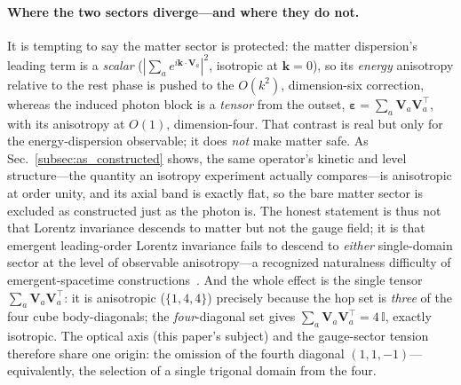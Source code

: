 \paragraph{Where the two sectors diverge---and where they do not.} It is tempting to say
the matter sector is protected: the matter dispersion's leading term is a \emph{scalar}
($|\sum_a e^{i\mathbf{k}\cdot\mathbf{V}_a}|^2$, isotropic at $\mathbf{k}=0$), so its
\emph{energy} anisotropy relative to the rest phase is pushed to the $O(k^2)$,
dimension-six correction, whereas the induced photon block is a \emph{tensor} from the
outset, $\boldsymbol{\varepsilon}=\sum_a\mathbf{V}_a\mathbf{V}_a^{\!\top}$, with its
anisotropy at $O(1)$, dimension-four. That contrast is real but only for the
energy-dispersion observable; it does \emph{not} make matter safe. As
Sec.~\ref{subsec:as_constructed} shows, the same operator's kinetic and level
structure---the quantity an isotropy experiment actually compares---is anisotropic at
order unity, and its axial band is exactly flat, so the bare matter sector is excluded as
constructed just as the photon is. The honest statement is thus not that Lorentz
invariance descends to matter but not the gauge field; it is that emergent leading-order
Lorentz invariance fails to descend to \emph{either} single-domain sector at the level of
observable anisotropy---a recognized naturalness difficulty of emergent-spacetime
constructions~\cite{collins2004}. And the whole effect is the single tensor
$\sum_a\mathbf{V}_a\mathbf{V}_a^{\!\top}$: it is anisotropic ($\{1,4,4\}$) precisely because
the hop set is \emph{three} of the four cube body-diagonals; the \emph{four}-diagonal set
gives $\sum_a\mathbf{V}_a\mathbf{V}_a^{\!\top}=4\,\mathbb{I}$, exactly isotropic. The
optical axis (this paper's subject) and the gauge-sector tension therefore share one
origin: the omission of the fourth diagonal $(1,1,-1)$---equivalently, the selection of a
single trigonal domain from the four.

